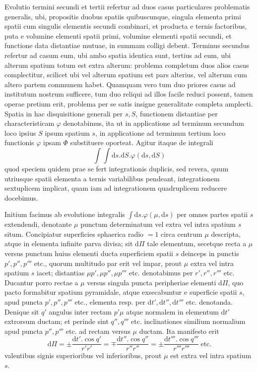 Evolutio termini secundi et tertii refertur ad duos casus particulares problematis generalis, ubi, propositis duobus spatiis quibuscunque, singula elementa primi spatii cum singulis elementis secundi combinari, et producta e ternis factoribus, puta e volumine elementi spatii primi, volumine elementi spatii secundi, et functione data distantiae mutuae, in summam colligi debent. Terminus secundus refertur ad casum eum, ubi ambo spatia identica sunt, tertius ad eum, ubi alterum spatium totum est extra alterum: problema completum duos alios casus complectitur, scilicet ubi vel alterum spatium est pars alterius, vel alterum cum altero partem communem habet. Quamquam vero tum duo priores casus ad institutum nostrum sufficere, tum duo reliqui ad illos facile reduci possent, tamen operae pretium erit, problema per se satis insigne generalitate completa amplecti. Spatia in hac disquisitione generali per $s,S$, functionem distantiae per characteristicam $\varphi$ denotabimus, ita ut in applicatione ad terminum secundum loco ipsius $S$ ipsum spatium $s$, in applicatione ad terminum tertium loco functionis $\varphi$ ipsam $\Phi$ substituere oporteat. Agitur itaque de integrali
\[
\int\int\mathrm{d}s.\mathrm{d}S.\varphi(\mathrm{d}s,\mathrm{d}S)
\]
quod speciem quidem prae se fert integrationis duplicis, sed revera, quum utriusque spatii elementa a ternis variabilibus pendeant, integrationem sextuplicem implicat, quam iam ad integrationem quadruplicem reducere docebimus.

Initium facimus ab evolutione integralis $\int\mathrm{d}s.\varphi(\mu,\mathrm{d}s)$ per omnes partes spatii $s$ extendendi, denotante $\mu$ punctum determinatum vel extra vel intra spatium $s$ situm. Concipiatur superficies sphaerica radio $=1$ circa centrum $\mu$ descripta, atque in elementa infinite parva divisa; sit $\mathrm{d}\Pi$ tale elementum, secetque recta a $\mu$ versus punctum huius elementi ducta superficiem spatii $s$ deinceps in punctis $p',p'',p'''$ etc., quorum multitudo par erit vel impar, prout $\mu$ extra vel intra spatium $s$ iacet; distantias $\mu p',\mu p'',\mu p'''$ etc. denotabimus per $r',r'',r'''$ etc. Ducantur porro rectae a $\mu$ versus singula puncta peripheriae elementi $\mathrm{d}\Pi$, quo pacto formabitur spatium pyramidale, atque exsecabuntur e superficie spatii $s$, apud puncta $p',p'',p'''$ etc., elementa resp. per $\mathrm{d}t',\mathrm{d}t'',\mathrm{d}t'''$ etc. denotanda. Denique sit $q'$ angulus inter rectam $p'\mu$ atque normalem in elementum $\mathrm{d}t'$ extrorsum ductam; et perinde sint $q'',q'''$ etc. inclinationes similium normalium apud puncta $p'',p'''$ etc. ad rectam versus $\mu$ ductam. Ita manifesto erit
\[
\mathrm{d}\Pi=\pm\frac{\mathrm{d}t'.\cos q'}{r'r'}=\mp\frac{\mathrm{d}t''.\cos q''}{r''r''}=\pm\frac{\mathrm{d}t'''.\cos q'''}{r'''r'''}\ \text{etc.}
\]
valentibus signis superioribus vel inferioribus, prout $\mu$ est extra vel intra spatium $s$.

